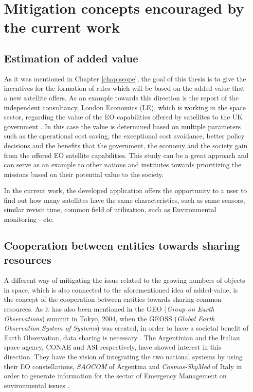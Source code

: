 \bigskip
\section{Mitigation concepts encouraged by the current work}
\label{section}
\bigskip

\subsection{Estimation of added value}
\bigskip
As it was mentioned in Chapter \ref{chap:scope}, the goal of this thesis is to give the incentives for the formation of rules which will be based on the added value that a new satellite offers. As an example towards this direction is the report of the independent consultancy, London Economics (LE), which is working in the space sector, regarding the value of the EO capabilities offered by satellites to the UK government \cite{Value UK}. In this case the value is determined based on multiple parameters such as the operational cost saving, the exceptional cost avoidance, better policy decisions and the benefits that the government, the economy and the society gain from the offered EO satellite capabilities. This study can be a great approach and can serve as an example to other nations and institutes towards prioritizing the missions based on their potential value to the society.

In the current work, the developed application offers the opportunity to a user to find out how many satellites have the same characteristics, such as same sensors, similar revisit time, common field of utilization, such as Environmental monitoring - etc.

\bigskip
\subsection{Cooperation between entities towards sharing resources}
\bigskip

A different way of mitigating the issue related to the growing numbers of objects in space, which is also connected to the aforementioned idea of added-value, is the concept of the cooperation between entities towards sharing common resources. As it has also been mentioned in the GEO (\textit{Group on Earth Observations}) summit in Tokyo, 2004, when the GEOSS (\textit{Global Earth Observation System of Systems}) was created, in order to have a societal benefit of Earth Observation, data sharing is necessary \cite{Kramer 2002}. %
The Argentinian and the Italian space agency, CONAE and ASI respectively, have showed interest in this direction. They have the vision of integrating the two national systems by using their EO constellations, \textit{SAOCOM} of Argentina and \textit{Cosmos-SkyMed} of Italy in order to generate information for the sector of Emergency Management on environmental issues \cite{Cosmos}.  %

